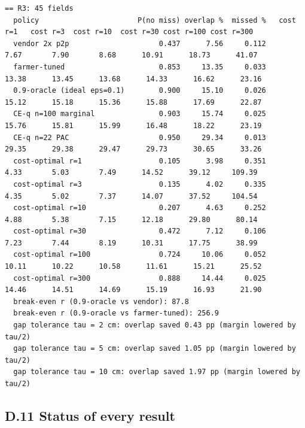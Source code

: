 \documentclass[preprint,12pt,authoryear]{elsarticle}
\begin{document}
\begin{Verbatim}[fontsize=\tiny,breaklines]
== R3: 45 fields
  policy                       P(no miss) overlap %  missed %   cost r=1   cost r=3  cost r=10  cost r=30 cost r=100 cost r=300
  vendor 2x p2p                     0.437      7.56     0.112       7.67       7.90       8.68      10.91      18.73      41.07
  farmer-tuned                      0.853     13.35     0.033      13.38      13.45      13.68      14.33      16.62      23.16
  0.9-oracle (ideal eps=0.1)        0.900     15.10     0.026      15.12      15.18      15.36      15.88      17.69      22.87
  CE-q n=100 marginal               0.903     15.74     0.025      15.76      15.81      15.99      16.48      18.22      23.19
  CE-q n=22 PAC                     0.950     29.34     0.013      29.35      29.38      29.47      29.73      30.65      33.26
  cost-optimal r=1                  0.105      3.98     0.351       4.33       5.03       7.49      14.52      39.12     109.39
  cost-optimal r=3                  0.135      4.02     0.335       4.35       5.02       7.37      14.07      37.52     104.54
  cost-optimal r=10                 0.207      4.63     0.252       4.88       5.38       7.15      12.18      29.80      80.14
  cost-optimal r=30                 0.472      7.12     0.106       7.23       7.44       8.19      10.31      17.75      38.99
  cost-optimal r=100                0.724     10.06     0.052      10.11      10.22      10.58      11.61      15.21      25.52
  cost-optimal r=300                0.888     14.44     0.025      14.46      14.51      14.69      15.19      16.93      21.90
  break-even r (0.9-oracle vs vendor): 87.8
  break-even r (0.9-oracle vs farmer-tuned): 256.9
  gap tolerance tau = 2 cm: overlap saved 0.43 pp (margin lowered by tau/2)
  gap tolerance tau = 5 cm: overlap saved 1.05 pp (margin lowered by tau/2)
  gap tolerance tau = 10 cm: overlap saved 1.97 pp (margin lowered by tau/2)
\end{Verbatim}

\subsection*{D.11 Status of every result}
\end{document}
